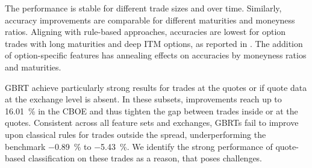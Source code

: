 The performance is stable for different trade sizes and over time. Similarly, accuracy improvements are comparable for different maturities and moneyness ratios. Aligning with rule-based approaches, accuracies are lowest for option trades with long maturities and deep \gls{ITM} options, as reported in \textcite[][22]{grauerOptionTradeClassification2022}. The addition of option-specific features has annealing effects on accuracies by moneyness ratios and maturities.

\gls{GBRT} achieve particularly strong results for trades at the quotes or if quote data at the exchange level is absent. In these subsets, improvements reach up to \SI{16.01}{\percent} in the \gls{CBOE} and thus tighten the gap between trades inside or at the quotes. Consistent across all feature sets and exchanges, \glspl{GBRT} fail to improve upon classical rules for trades outside the spread, underperforming the benchmark \SI{-0.89}{\percent} to \SI{-5.43}{\percent}. We identify the strong performance of quote-based classification on these trades as a reason, that poses challenges.

